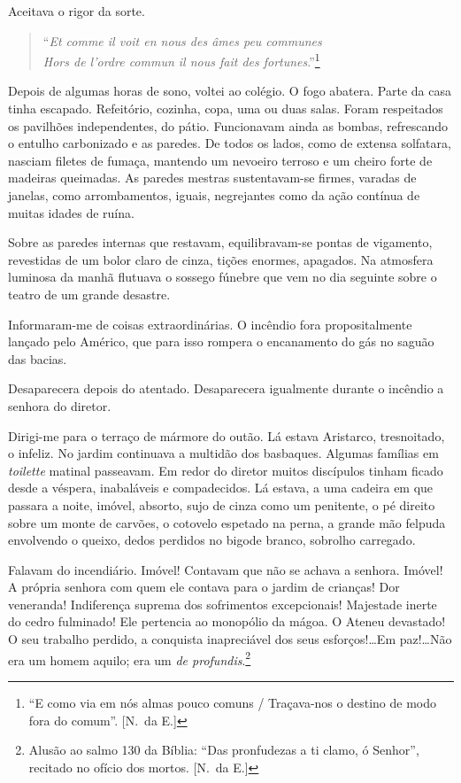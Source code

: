 Aceitava o rigor da sorte. 

\begin{verse}
\hspace{-2em}``\textit{Et comme il voit en nous des âmes peu communes}\\
\hspace{-2em}\textit{Hors de l'ordre commun il nous fait des fortunes}.''\footnote{ ``E como 
via em nós almas pouco comuns / Traçava-nos o destino de modo fora do comum''. [N.~da E.]}
\end{verse}

\noindent\dotfill

Depois de algumas horas de sono, voltei ao colégio. O fogo abatera. Parte da casa
tinha escapado. Refeitório, cozinha, copa, uma ou duas salas. Foram
respeitados os pavilhões independentes, do pátio. Funcionavam ainda as
bombas, refrescando o entulho carbonizado e as paredes. De todos os
lados, como de extensa solfatara, nasciam filetes de fumaça, mantendo
um nevoeiro terroso e um cheiro forte de madeiras queimadas. As paredes
mestras sustentavam{}-se firmes, varadas de janelas, como
arrombamentos, iguais, negrejantes como da ação contínua de muitas
idades de ruína. 


Sobre as paredes internas que restavam,
equilibravam{}-se pontas de vigamento, revestidas de um bolor claro de
cinza, tições enormes, apagados. Na atmosfera luminosa da manhã
flutuava o sossego fúnebre que vem no dia seguinte sobre o teatro de um
grande desastre. 

Informaram{}-me de coisas extraordinárias. O incêndio
fora propositalmente lançado pelo Américo, que para isso rompera o
encanamento do gás no saguão das bacias. 

Desaparecera depois do
atentado. Desaparecera igualmente durante o incêndio a senhora do
diretor. 

Dirigi{}-me para o terraço de mármore do outão. Lá estava
Aristarco, tresnoitado, o infeliz. No jardim continuava a multidão dos
basbaques. Algumas famílias em \textit{toilette} matinal passeavam. Em redor do
diretor muitos discípulos tinham ficado desde a véspera, inabaláveis e
compadecidos. Lá estava, a uma cadeira em que passara a noite, imóvel,
absorto, sujo de cinza como um penitente, o pé direito sobre um monte
de carvões, o cotovelo espetado na perna, a grande mão felpuda
envolvendo o queixo, dedos perdidos no bigode branco, sobrolho
carregado. 

Falavam do incendiário. Imóvel! Contavam que não se achava a
senhora. Imóvel! A própria senhora com quem ele contava para o jardim
de crianças! Dor veneranda! Indiferença suprema dos sofrimentos
excepcionais! Majestade inerte do cedro fulminado! Ele pertencia ao
monopólio da mágoa. O Ateneu devastado! O seu trabalho perdido, a
conquista inapreciável dos seus esforços!\ldots Em paz!\ldots Não era um
homem aquilo; era um \textit{de profundis}.\footnote{ Alusão ao salmo 130 da Bíblia:
``Das pronfudezas a ti clamo, ó Senhor'', recitado no ofício dos mortos. [N.~da E.]} 

